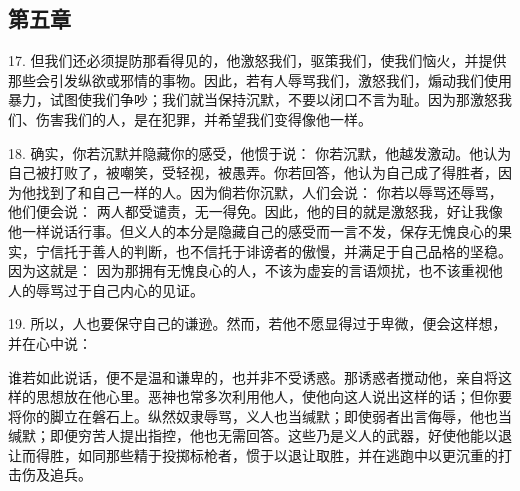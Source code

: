 
\subsection{第五章}

\par

17. 但我们还必须提防那看得见的，他激怒我们，驱策我们，使我们恼火，并提供那些会引发纵欲或邪情的事物。因此，若有人辱骂我们，激怒我们，煽动我们使用暴力，试图使我们争吵；我们就当保持沉默，不要以闭口不言为耻。因为那激怒我们、伤害我们的人，是在犯罪，并希望我们变得像他一样。\par

18. 确实，你若沉默并隐藏你的感受，他惯于说： 你若沉默，他越发激动。他认为自己被打败了，被嘲笑，受轻视，被愚弄。你若回答，他认为自己成了得胜者，因为他找到了和自己一样的人。因为倘若你沉默，人们会说： 你若以辱骂还辱骂，他们便会说： 两人都受谴责，无一得免。因此，他的目的就是激怒我，好让我像他一样说话行事。但义人的本分是隐藏自己的感受而一言不发，保存无愧良心的果实，宁信托于善人的判断，也不信托于诽谤者的傲慢，并满足于自己品格的坚稳。因为这就是： 因为那拥有无愧良心的人，不该为虚妄的言语烦扰，也不该重视他人的辱骂过于自己内心的见证。\par

19. 所以，人也要保守自己的谦逊。然而，若他不愿显得过于卑微，便会这样想，并在心中说：\par

谁若如此说话，便不是温和谦卑的，也并非不受诱惑。那诱惑者搅动他，亲自将这样的思想放在他心里。恶神也常多次利用他人，使他向这人说出这样的话；但你要将你的脚立在磐石上。纵然奴隶辱骂，义人也当缄默；即使弱者出言侮辱，他也当缄默；即便穷苦人提出指控，他也无需回答。这些乃是义人的武器，好使他能以退让而得胜，如同那些精于投掷标枪者，惯于以退让取胜，并在逃跑中以更沉重的打击伤及追兵。\par

